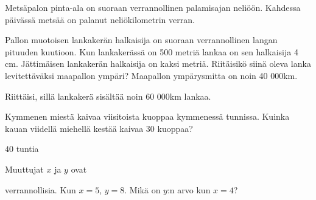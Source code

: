 \begin{tehtavasivu}
\begin{tehtava}
	Metsäpalon pinta-ala on suoraan verrannollinen palamisajan neliöön. Kahdessa päivässä metsää on palanut neliökilometrin verran. 
	\begin{alakohdat}
\end{alakohdat} 
	\begin{vastaus}
		\begin{alakohdat}
\end{alakohdat} 
	\end{vastaus}
\end{tehtava}

\begin{tehtava}
Pallon muotoisen lankakerän halkaisija on suoraan verrannollinen langan pituuden kuutioon. Kun lankakerässä on 500 metriä lankaa on sen halkaisija 4 cm. Jättimäisen lankakerän halkaisija on kaksi metriä. Riitäisikö siinä oleva lanka levitettäväksi maapallon ympäri? Maapallon ympärysmitta on noin 40 000km.
\begin{vastaus}
Riittäisi, sillä lankakerä sisältää noin 60 000km lankaa.
\end{vastaus}
\end{tehtava}

\begin{tehtava}
	Kymmenen miestä kaivaa viisitoista kuoppaa kymmenessä tunnissa.
	Kuinka kauan viidellä miehellä kestää kaivaa $30$ kuoppaa?	
	\begin{vastaus}
		$40$ tuntia
	\end{vastaus}
\end{tehtava}

\begin{tehtava}
	Muuttujat $x$ ja $y$ ovat
	\begin{alakohdatrivi}
		\alakohta{suoraan}
		\alakohta{kääntäen}
	\end{alakohdatrivi}
	verrannollisia. Kun $x = 5$, $y = 8$. Mikä on $y$:n arvo kun $x = 4$?
	\begin{vastaus}
		\begin{alakohdat}
			\alakohta{$\frac{32}{5}$}
			\alakohta{$10$}
		\end{alakohdat}
	\end{vastaus}
\end{tehtava}


\end{tehtavasivu}
